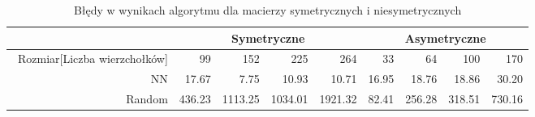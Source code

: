 \begin{table}
\begin{tabular}{|r|r|r|r|r|r|r|r|r|}
\hline
 & \multicolumn{4}{|c|}{Symetryczne} & \multicolumn{4}{|c|}{Asymetryczne} \\ \hline\
Rozmiar[Liczba wierzchołków] & 99 & 152 & 225 & 264 & 33 & 64 & 100 & 170 \\ \hline
NN & 17.67 & 7.75 & 10.93 & 10.71 & 16.95 & 18.76 & 18.86 & 30.20 \\
Random & 436.23 & 1113.25 & 1034.01 & 1921.32 & 82.41 & 256.28 & 318.51 & 730.16 \\ \hline
\end{tabular}
\caption{Błędy w wynikach algorytmu dla macierzy symetrycznych i niesymetrycznych}
\label{tab:error_TsStartVal}
\end{table}
